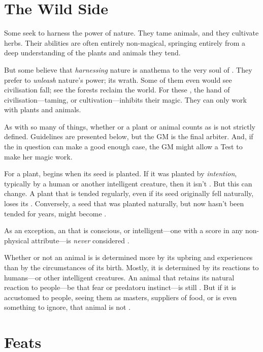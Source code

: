 
\section{The Wild Side}

Some  seek to harness the power of nature.
They tame animals, and they cultivate herbs.
Their abilities are often entirely non-magical, springing entirely from a deep understanding of the plants and animals they tend.

But some believe that \emph{harnessing} nature is anathema to the very soul of .
They prefer to \emph{unleash} nature's power; its wrath.
Some of them even would see civilisation fall; see the forests reclaim the world.
For these , the hand of civilisation---taming, or cultivation---inhibits their magic.
They can only work with {\wild} plants and animals.

As with so many of things, whether or a plant or animal counts as {\wild} is not strictly defined.
Guidelines are presented below, but the GM is the final arbiter.
And, if the  in question can make a good enough case, the GM might allow a Test to make her magic work.

For a plant, {\wildness} begins when its seed is planted.
If it was planted by \emph{intention}, typically by a human or another intelligent creature, then it isn't {\wild}.
But this can change.
A plant that is tended regularly, even if its seed originally fell naturally, loses its {\wildness}.
Conversely, a seed that was planted naturally, but now hasn't been tended for years, might become {\wild}.

As an exception, an  that is conscious, or intelligent---one with a score in any non-physical attribute---is \emph{never} considered {\wild}.

Whether or not an animal is {\wild} is determined more by its upbring and experiences than by the circumstances of its birth.
Mostly, it is determined by its reactions to humans---or other intelligent creatures.
An animal that retains its natural reaction to people---be that fear or predatoru instinct---is still {\wild}.
But if it is accustomed to people, seeing them as masters, suppliers of food, or is even something to ignore, that animal is not {\wild}.

\section{Feats}

